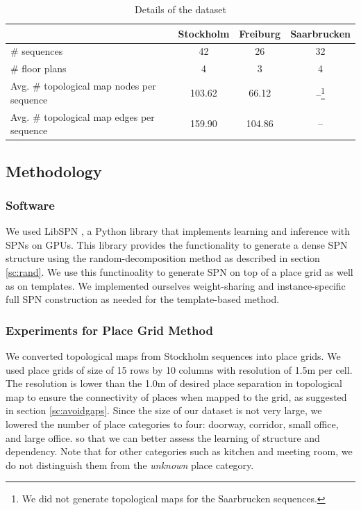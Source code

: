 \documentclass[10pt, titlepage]{article}
\theoremstyle{definition}
\begin{document}
\begin{table}[h!]
\centering
 \begin{tabular}{|l|c|c|c|} 
 \hline
  & Stockholm & Freiburg & Saarbrucken \\ [0.5ex] 
 \hline
 \# sequences & 42 & 26 & 32 \\ 
 \hline
 \# floor plans & 4 & 3 & 4 \\
 \hline
 Avg. \# topological map nodes per sequence & 103.62 & 66.12 & --\footnote{We did not generate topological maps for the Saarbrucken sequences.} \\
 \hline
 Avg. \# topological map edges per sequence & 159.90 & 104.86 & -- \\
 \hline
 \end{tabular}
 \caption{Details of the dataset}
 \label{table:dataset}
\end{table}

\subsection{Methodology}\label{section:method}
\subsubsection{Software}
We used LibSPN \cite{pronobis2016learning}, a Python library that implements learning and inference with SPNs on GPUs. This library provides the functionality to generate a dense SPN structure using the random-decomposition method as described in section \ref{sc:rand}. We use this functinoality to generate SPN on top of a place grid as well as on templates. We implemented ourselves weight-sharing and instance-specific full SPN construction as needed for the template-based method. 

\subsubsection{Experiments for Place Grid Method}\label{section:exp-grid}

We converted topological maps from Stockholm sequences into place grids. We used place grids of size of 15 rows by 10 columns with resolution of 1.5m per cell. The resolution is lower than the 1.0m of desired place separation in topological map to ensure the connectivity of places when mapped to the grid, as suggested in section \ref{sc:avoidgaps}. Since the size of our dataset is not very large, we lowered the number of place categories to four: doorway, corridor, small office, and large office. so that we can better assess the learning of structure and dependency. Note that for other categories such as kitchen and meeting room, we do not distinguish them from the \textit{unknown} place category.
\end{document}
